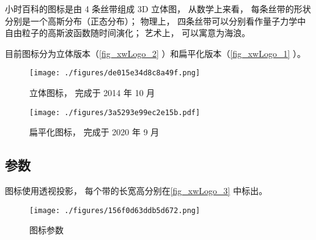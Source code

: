 
\begin{issues}
\issueTODO
\end{issues}

小时百科的图标是由 4 条丝带组成 3D 立体图， 从数学上来看， 每条丝带的形状分别是一个高斯分布（正态分布）； 物理上， 四条丝带可以分别看作量子力学中自由粒子的高斯波函数随时间演化； 艺术上， 可以寓意为海浪。

目前图标分为立体版本（\autoref{fig_xwLogo_2} ）和扁平化版本（\autoref{fig_xwLogo_1} ）。

\begin{figure}[ht]
\centering
\texttt{[image: ./figures/de015e34d8c8a49f.png]}
\caption{立体图标， 完成于 2014 年 10 月} \label{fig_xwLogo_2}
\end{figure}

\begin{figure}[ht]
\centering
\texttt{[image: ./figures/3a5293e99ec2e15b.pdf]}
\caption{扁平化图标， 完成于 2020 年 9 月} \label{fig_xwLogo_1}
\end{figure}

\subsection{参数}
图标使用透视投影， 每个带的长宽高分别在\autoref{fig_xwLogo_3} 中标出。
\begin{figure}[ht]
\centering
\texttt{[image: ./figures/156f0d63ddb5d672.png]}
\caption{图标参数} \label{fig_xwLogo_3}
\end{figure}
